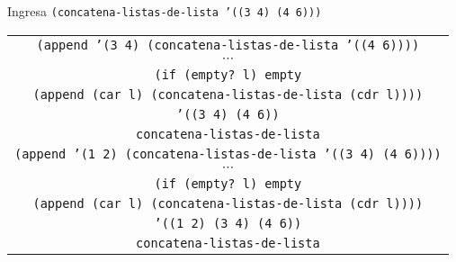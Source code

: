 \documentclass[letterpaper,11pt]{article}
\begin{document}
\begin{enumerate}
\begin{enumerate}
        Ingresa \texttt{(concatena-listas-de-lista '((3 4) (4 6)))}
        \begin{center}
            \begin{tabular}{|c|}
                \hline
                \texttt{(append '(3 4) 
                (concatena-listas-de-lista '((4 6))))}  \\
                $\cdots$ \\
                \texttt{(if (empty? l) empty} \\
                \texttt{(append (car l) (concatena-listas-de-lista (cdr l))))} \\
                \texttt{'((3 4) (4 6))} \\
                \texttt{concatena-listas-de-lista} \\
                \hline
                \hline
                \texttt{(append '(1 2) 
                (concatena-listas-de-lista '((3 4) (4 6))))}  \\
                $\cdots$ \\
                \texttt{(if (empty? l) empty} \\
                \texttt{(append (car l) (concatena-listas-de-lista (cdr l))))} \\
                \texttt{'((1 2) (3 4) (4 6))} \\
                \texttt{concatena-listas-de-lista} \\
                \hline
            \end{tabular}
        \end{center}


\end{enumerate}
\end{enumerate}
\end{document}
